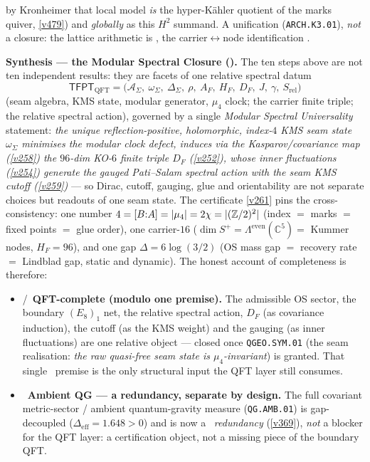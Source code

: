 by Kronheimer that local model \emph{is} the hyper-K\"ahler quotient of the marks quiver, \vref{v479})
and \emph{globally} as this $H^2$ summand. A unification (\texttt{ARCH.K3.01}), \emph{not} a closure: the
lattice arithmetic is \mE, the carrier$\leftrightarrow$node identification \mC.
\par\smallskip\noindent\textbf{Synthesis --- the Modular Spectral Closure ().}
The ten steps above are not ten independent results: they are facets of one relative spectral datum
\[
  \boxed{\ \mathsf{TFPT}_{\mathrm{QFT}}=\bigl(\mathcal A_\Sigma,\ \omega_\Sigma,\ \Delta_\Sigma,\ \rho,\
  A_F,\ H_F,\ D_F,\ J,\ \gamma,\ S_{\mathrm{rel}}\bigr)\ }
\]
(seam algebra, KMS state, modular generator, $\mu_4$ clock; the carrier finite triple; the relative
spectral action), governed by a single \emph{Modular Spectral Universality} statement: \emph{the unique
reflection-positive, holomorphic, index-$4$ KMS seam state $\omega_\Sigma$ minimises the modular clock
defect, induces via the Kasparov/covariance map (\vref{v258}) the $96$-dim KO-$6$ finite triple $D_F$
(\vref{v252}), whose inner fluctuations (\vref{v254}) generate the gauged Pati--Salam spectral action with
the seam KMS cutoff (\vref{v259})} --- so Dirac, cutoff, gauging, glue and orientability are not separate
choices but readouts of one seam state. The certificate \vref{v261} pins the cross-consistency: one number
$4=[B{:}A]=|\mu_4|=2\chi=|(\mathbb Z/2)^2|$ (index $=$ marks $=$ fixed points $=$ glue order), one carrier-$16$
($\dim S^+=\Lambda^{\mathrm{even}}(\mathbb C^5)=$ Kummer nodes, $H_F=96$), and one gap
$\Delta=6\log(3/2)$ (OS mass gap $=$ recovery rate $=$ Lindblad gap, static and dynamic). The honest
account of completeness is therefore:
\begin{itemize}\setlength\itemsep{1pt}
\item \mE/\mC\ \textbf{QFT-complete (modulo one premise).} The admissible OS sector, the boundary
  $(E_8)_1$ net, the relative spectral action, $D_F$ (as covariance induction), the cutoff (as the KMS
  weight) and the gauging (as inner fluctuations) are one relative object --- closed once
  \texttt{QGEO.SYM.01} (the seam realisation: \emph{the raw quasi-free seam state is $\mu_4$-invariant}) is
  granted. That single \mO\ premise is the only structural input the QFT layer still consumes.
\item \mC\ \textbf{Ambient QG --- a redundancy, separate by design.} The full covariant metric-sector / ambient
  quantum-gravity measure (\texttt{QG.AMB.01}) is gap-decoupled ($\Delta_{\mathrm{eff}}=1.648>0$) and is now a
  \mC\ \emph{redundancy} (\vref{v369}), \emph{not} a blocker for the QFT layer: a certification object, not a
  missing piece of the boundary QFT.
\end{itemize}
